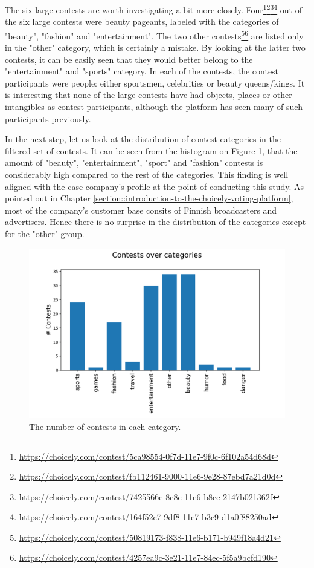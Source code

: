     The six large contests are worth investigating a bit more closely. Four\footnote{\url{https://choicely.com/contest/5ca98554-0f7d-11e7-9f0c-6f102a54d68d}}\footnote{\url{https://choicely.com/contest/fb112461-9000-11e6-9e28-87ebd7a21d0d}}\footnote{\url{https://choicely.com/contest/7425566e-8c8e-11e6-b8ce-2147b021362f}}\footnote{\url{https://choicely.com/contest/164f52c7-9df8-11e7-b3c9-d1a0f88250ad}}
    out of the six large contests were beauty pageants, labeled with the categories of "beauty", "fashion" and "entertainment". The two other contests\footnote{\url{https://choicely.com/contest/50819173-f838-11e6-b171-b949f18a4d21}}\footnote{\url{https://choicely.com/contest/4257ea9c-3e21-11e7-84ec-5f5a9bcfd190}}
    are listed only in the "other" category, which is certainly a mistake. By looking at the latter two contests, it can be easily seen that they would better belong to the "entertainment" and "sports" category. In each of the contests, the contest participants were people: either sportsmen, celebrities or beauty queens/kings. It is interesting that none of the large contests have had objects, places or other intangibles as contest participants, although the platform has seen many of such participants previously. 

    In the next step, let us look at the distribution of contest categories in the filtered set of contests. It can be seen from the histogram on Figure \ref{contests_over_categories}, that the amount of "beauty", "entertainment", "sport" and "fashion" contests is considerably high compared to the rest of the categories. This finding is well aligned with the case company's profile at the point of conducting this study. As pointed out in Chapter \ref{section::introduction-to-the-choicely-voting-platform}, most of the company's customer base consits of Finnish broadcasters and advertisers. Hence there is no surprise in the distribution of the categories except for the "other" group. 
    
    \begin{figure}[h] 
        \begin{center}
            \includegraphics[width=1\textwidth]{Images/contests_over_categories.png}
            \caption{The number of contests in each category.}
            \label{contests_over_categories}
        \end{center}
    \end{figure}
    
